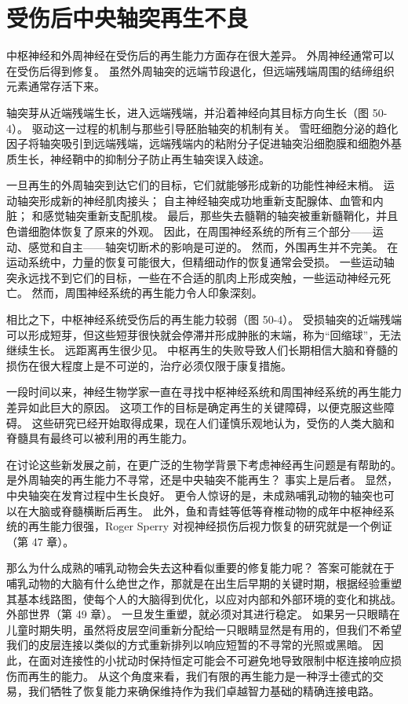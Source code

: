 \section{受伤后中央轴突再生不良}

中枢神经和外周神经在受伤后的再生能力方面存在很大差异。 外周神经通常可以在受伤后得到修复。 虽然外周轴突的远端节段退化，但远端残端周围的结缔组织元素通常存活下来。

轴突芽从近端残端生长，进入远端残端，并沿着神经向其目标方向生长（图 50-4）。 驱动这一过程的机制与那些引导胚胎轴突的机制有关。 雪旺细胞分泌的趋化因子将轴突吸引到远端残端，远端残端内的粘附分子促进轴突沿细胞膜和细胞外基质生长，神经鞘中的抑制分子防止再生轴突误入歧途。

一旦再生的外周轴突到达它们的目标，它们就能够形成新的功能性神经末梢。 运动轴突形成新的神经肌肉接头； 自主神经轴突成功地重新支配腺体、血管和内脏； 和感觉轴突重新支配肌梭。 最后，那些失去髓鞘的轴突被重新髓鞘化，并且色谱细胞体恢复了原来的外观。 因此，在周围神经系统的所有三个部分——运动、感觉和自主——轴突切断术的影响是可逆的。 然而，外围再生并不完美。 在运动系统中，力量的恢复可能很大，但精细动作的恢复通常会受损。 一些运动轴突永远找不到它们的目标，一些在不合适的肌肉上形成突触，一些运动神经元死亡。 然而，周围神经系统的再生能力令人印象深刻。

相比之下，中枢神经系统受伤后的再生能力较弱（图 50-4）。 受损轴突的近端残端可以形成短芽，但这些短芽很快就会停滞并形成肿胀的末端，称为“回缩球”，无法继续生长。 远距离再生很少见。 中枢再生的失败导致人们长期相信大脑和脊髓的损伤在很大程度上是不可逆的，治疗必须仅限于康复措施。

一段时间以来，神经生物学家一直在寻找中枢神经系统和周围神经系统的再生能力差异如此巨大的原因。 这项工作的目标是确定再生的关键障碍，以便克服这些障碍。 这些研究已经开始取得成果，现在人们谨慎乐观地认为，受伤的人类大脑和脊髓具有最终可以被利用的再生能力。

在讨论这些新发展之前，在更广泛的生物学背景下考虑神经再生问题是有帮助的。 是外周轴突的再生能力不寻常，还是中央轴突不能再生？ 事实上是后者。 显然，中央轴突在发育过程中生长良好。 更令人惊讶的是，未成熟哺乳动物的轴突也可以在大脑或脊髓横断后再生。 此外，鱼和青蛙等低等脊椎动物的成年中枢神经系统的再生能力很强，Roger Sperry 对视神经损伤后视力恢复的研究就是一个例证（第 47 章）。

那么为什么成熟的哺乳动物会失去这种看似重要的修复能力呢？ 答案可能就在于哺乳动物的大脑有什么绝世之作，那就是在出生后早期的关键时期，根据经验重塑其基本线路图，使每个人的大脑得到优化，以应对内部和外部环境的变化和挑战。 外部世界（第 49 章）。 一旦发生重塑，就必须对其进行稳定。 如果另一只眼睛在儿童时期失明，虽然将皮层空间重新分配给一只眼睛显然是有用的，但我们不希望我们的皮层连接以类似的方式重新排列以响应短暂的不寻常的光照或黑暗。 因此，在面对连接性的小扰动时保持恒定可能会不可避免地导致限制中枢连接响应损伤而再生的能力。 从这个角度来看，我们有限的再生能力是一种浮士德式的交易，我们牺牲了恢复能力来确保维持作为我们卓越智力基础的精确连接电路。

